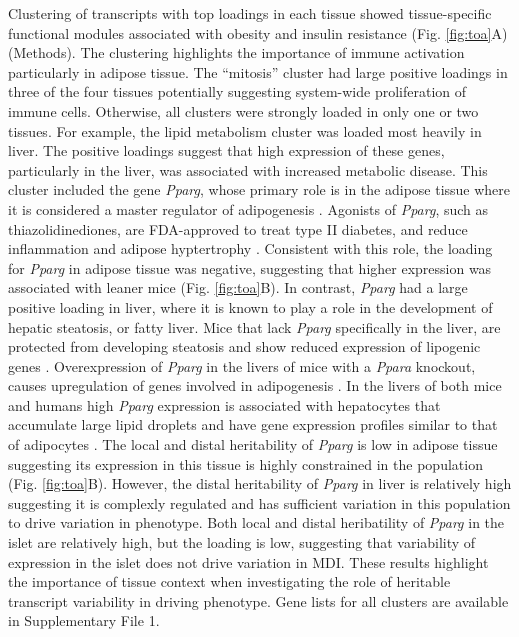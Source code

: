 \documentclass[
]{article}
\begin{document}
Clustering of transcripts with top loadings in each tissue showed
tissue-specific functional modules associated with obesity and insulin
resistance (Fig. \ref{fig:toa}A) (Methods). The clustering highlights
the importance of immune activation particularly in adipose tissue. The
``mitosis'' cluster had large positive loadings in three of the four
tissues potentially suggesting system-wide proliferation of immune
cells. Otherwise, all clusters were strongly loaded in only one or two
tissues. For example, the lipid metabolism cluster was loaded most
heavily in liver. The positive loadings suggest that high expression of
these genes, particularly in the liver, was associated with increased
metabolic disease. This cluster included the gene \textit{Pparg}, whose
primary role is in the adipose tissue where it is considered a master
regulator of adipogenesis \cite{pmid17389767}. Agonists of
\textit{Pparg}, such as thiazolidinediones, are FDA-approved to treat
type II diabetes, and reduce inflammation and adipose hyptertrophy
\cite{pmid17389767}. Consistent with this role, the loading for
\textit{Pparg} in adipose tissue was negative, suggesting that higher
expression was associated with leaner mice (Fig. \ref{fig:toa}B). In
contrast, \textit{Pparg} had a large positive loading in liver, where it
is known to play a role in the development of hepatic steatosis, or
fatty liver. Mice that lack \textit{Pparg} specifically in the liver,
are protected from developing steatosis and show reduced expression of
lipogenic genes \cite{pmid12805374, pmid12618528}. Overexpression of
\textit{Pparg} in the livers of mice with a \textit{Ppara} knockout,
causes upregulation of genes involved in adipogenesis
\cite{pmid16357043}. In the livers of both mice and humans high
\textit{Pparg} expression is associated with hepatocytes that accumulate
large lipid droplets and have gene expression profiles similar to that
of adipocytes \cite{pmid15644454, pmid16403437}. The local and distal
heritability of \textit{Pparg} is low in adipose tissue suggesting its
expression in this tissue is highly constrained in the population (Fig.
\ref{fig:toa}B). However, the distal heritability of \textit{Pparg} in
liver is relatively high suggesting it is complexly regulated and has
sufficient variation in this population to drive variation in phenotype.
Both local and distal heribatility of \textit{Pparg} in the islet are
relatively high, but the loading is low, suggesting that variability of
expression in the islet does not drive variation in MDI. These results
highlight the importance of tissue context when investigating the role
of heritable transcript variability in driving phenotype. Gene lists for
all clusters are available in Supplementary File 1.
\end{document}

